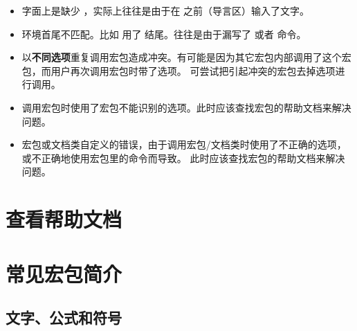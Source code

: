 \begin{itemize}
\item {}

字面上是缺少 ，实际上往往是由于在  之前（导言区）输入了文字。

\item {}

环境首尾不匹配。比如  用了  结尾。往往是由于漏写了 
或者  命令。

\item {}

以\textbf{不同选项}重复调用宏包造成冲突。有可能是因为其它宏包内部调用了这个宏包，而用户再次调用宏包时带了选项。
可尝试把引起冲突的宏包去掉选项进行调用。

\item {}

调用宏包时使用了宏包不能识别的选项。此时应该查找宏包的帮助文档来解决问题。

\item {}

宏包或文档类自定义的错误，由于调用宏包/文档类时使用了不正确的选项，或不正确地使用宏包里的命令而导致。
此时应该查找宏包的帮助文档来解决问题。

\end{itemize}

\section{查看帮助文档}\label{sec:texdoc}

\leavevmode\nobreakspace

\section{常见宏包简介}\label{sec:pkg-list}

\def\pkglabel#1{\makebox[60pt][l]{\pkg{#1}}}
\newenvironment{pkglist}%
  {\list{}{%
    \labelwidth=60pt 
    \itemindent=0pt 
    \leftmargin=60pt 
    \labelsep=0pt 
    \let\makelabel\pkglabel}}%
  {\endlist}

\subsection{文字、公式和符号}\label{subsec:text-math-symbols}

